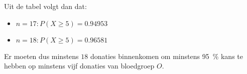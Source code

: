 \begin{question}{20}
{        Uit de tabel volgt dan dat:
        \begin{itemize}
            \item[] $n = 17: P(X \geq 5) = 0.94953$
            \item[] $n = 18: P(X \geq 5) = 0.96581$ 
        \end{itemize}
        
        Er moeten dus minstens $18$ donaties binnenkomen om minstens \SI{95}{\percent} kans te hebben op minstens vijf donaties van bloedgroep $O$. 
    }

\end{question}